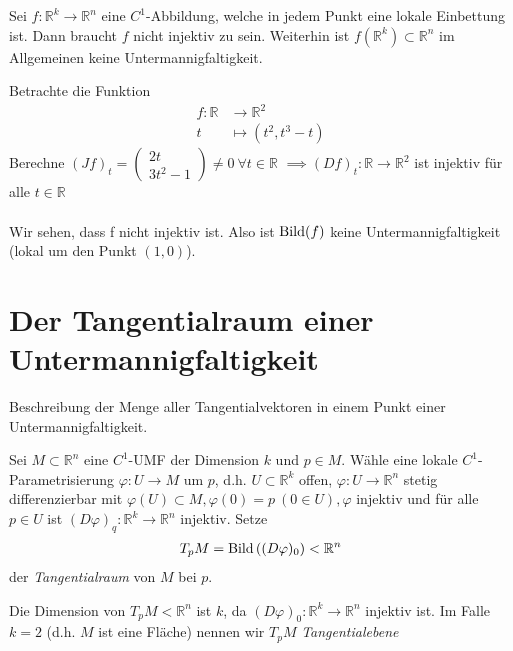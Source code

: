 \documentclass[../main.tex]{subfiles}
\begin{document}
\begin{remark}
Sei $f: \mathbb{R}^k \to \mathbb{R}^n$ eine $C^1$-Abbildung, welche in jedem Punkt eine lokale Einbettung ist.
Dann braucht $f$ nicht injektiv zu sein. Weiterhin ist $f(\mathbb{R}^k) \subset \mathbb{R}^n$ im Allgemeinen keine Untermannigfaltigkeit.
\end{remark}
\begin{example}
Betrachte die Funktion
\begin{align*}
    f \colon \mathbb{R} & \to \mathbb{R}^2 \\
    t & \mapsto (t^2,t^3-t)
\end{align*}
Berechne $(Jf)_t = \begin{pmatrix}2t \\ 3t^2 -1\end{pmatrix} \not  = 0 \ \forall t \in \mathbb{R}$
$\implies (Df)_t : \mathbb{R} \to \mathbb{R}^2$ ist injektiv für alle $t \in \mathbb{R}$
\\ \\
Wir sehen, dass f nicht injektiv ist. Also ist $\operatorname{Bild} (f)$ keine Untermannigfaltigkeit (lokal um den Punkt $(1,0)$).
\end{example}

\section{Der Tangentialraum einer Untermannigfaltigkeit}

\begin{goal}
Beschreibung der Menge aller Tangentialvektoren in einem Punkt einer Untermannigfaltigkeit.
\end{goal}

\begin{definition}
Sei $M \subset \mathbb{R}^n$ eine $C^1$-UMF der Dimension $k$ und $p \in M$. Wähle eine lokale $C^1$-Parametrisierung $\varphi : U \to M$ um $p$, d.h. $U \subset \mathbb{R}^k$ offen, $\varphi : U \to
\mathbb{R}^n$ stetig differenzierbar mit $\varphi(U) \subset M, \varphi (0)=p \ (0 \in U), \varphi$ injektiv und für alle $p\in U$ ist $(D\varphi)_q : \mathbb{R}^k \to \mathbb{R}^n $ injektiv. Setze
\begin{align*}
    T_pM = \operatorname{Bild}\left((D\varphi)_0\right) < \mathbb{R}^n
\end{align*} der \emph{Tangentialraum} von $M$ bei $p$.
\end{definition}

\begin{remark}
Die Dimension von $T_pM < \mathbb{R}^n$ ist $k$, da $(D\varphi)_0 : \mathbb{R}^k \to \mathbb{R}^n$ injektiv ist. Im Falle $k=2$ (d.h. $M$ ist eine Fläche) nennen wir $T_pM$ \emph{Tangentialebene} 
\end{remark}
\end{document}
